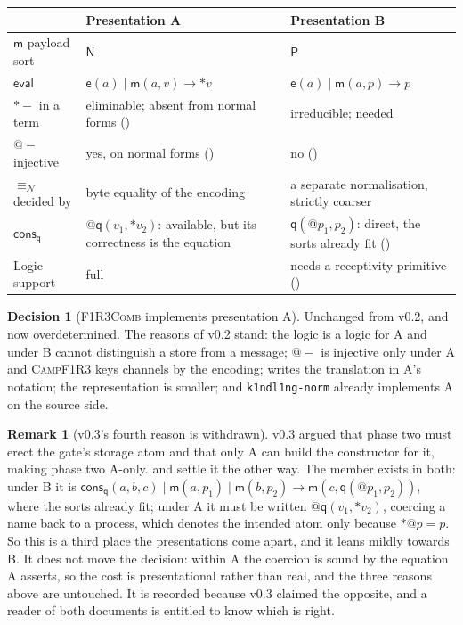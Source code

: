\documentclass[11pt,a4paper]{article}
\makeatletter
\newcommand{\code}[1]{\texttt{#1}}
\newcommand{\Comb}{\textsc{F1R3Comb}}
\newcommand{\Camp}{\textsc{CampF1R3}}
\newcommand{\quo}[1]{@#1}
\newcommand{\drp}[1]{{*}#1}
\newcommand{\nequiv}{\equiv_{\mathcal{N}}}
\newcommand{\Nsort}{\mathsf{N}}
\newcommand{\Psort}{\mathsf{P}}
\newcommand{\mm}{\mathsf{m}}
\newcommand{\ev}{\mathsf{e}}
\newcommand{\qq}{\mathsf{q}}
\newcommand{\cons}{\mathsf{cons}}
\newcommand{\red}{\longrightarrow}
\theoremstyle{definition}
\newtheorem{decision}[definition]{Decision}
\newtheorem{remark}[definition]{Remark}
\theoremstyle{plain}
\makeatother
\begin{document}
\begin{center}
\begin{tabularx}{\linewidth}{@{}l>{\raggedright\arraybackslash}X>{\raggedright\arraybackslash}X@{}}
\toprule
& Presentation A & Presentation B\\
\midrule
$\mm$ payload sort & $\Nsort$ & $\Psort$\\
$\mathsf{eval}$ & $\ev(a) \mid \mm(a,v) \red \drp{v}$ &
  $\ev(a) \mid \mm(a,p) \red p$\\
$\drp{-}$ in a term & eliminable; absent from normal forms
  (\cite[Lem.~2.8]{logic}) & irreducible; needed\\
$\quo{-}$ injective & yes, on normal forms (\cite[Prop.~2.10]{logic}) & no
  (\cite[Prop.~2.4(ii)]{logic})\\
$\nequiv$ decided by & byte equality of the encoding & a separate
  normalisation, strictly coarser\\
$\cons_{\qq}$ & $\quo{\qq(v_{1},\drp{v_{2}})}$: available, but its
  correctness is the equation & $\qq(\quo{p_{1}},p_{2})$: direct, the sorts
  already fit (\cite[Rem.~3.9]{draft3})\\
Logic support & full & needs a receptivity primitive
  (\cite[Rem.~2.5]{logic})\\
\bottomrule
\end{tabularx}
\end{center}

\begin{decision}[\Comb{} implements presentation A]\label{dec:presA}
Unchanged from v0.2, and now overdetermined. The reasons of v0.2 stand: the
logic is a logic for A and under B cannot distinguish a store from a message;
$\quo{-}$ is injective only under A and \Camp{} keys channels by the encoding;
\cite[Def.~3.3]{draft3} writes the translation in A's notation; the
representation is smaller; and \code{k1ndl1ng-norm} already implements A on
the source side.
\end{decision}

\begin{remark}[v0.3's fourth reason is withdrawn]\label{rem:withdrawn}
v0.3 argued that phase two must erect the gate's storage atom and that only A
can build the constructor for it, making phase two A-only.
\cite[Def.~3.8]{draft3} and \cite[Rem.~3.9]{draft3} settle it the other way.
The member exists in both: under B it is
$\cons_{\qq}(a,b,c) \mid \mm(a,p_{1}) \mid \mm(b,p_{2}) \red
\mm(c,\qq(\quo{p_{1}},p_{2}))$, where the sorts already fit; under A it must
be written $\quo{\qq(v_{1},\drp{v_{2}})}$, coercing a name back to a process,
which denotes the intended atom only because $\drp{\quo{p}} = p$. So this is a
third place the presentations come apart, and it leans mildly towards B. It
does not move the decision: within A the coercion is sound by the equation A
asserts, so the cost is presentational rather than real, and the three reasons
above are untouched. It is recorded because v0.3 claimed the opposite, and a
reader of both documents is entitled to know which is right.
\end{remark}
\end{document}
